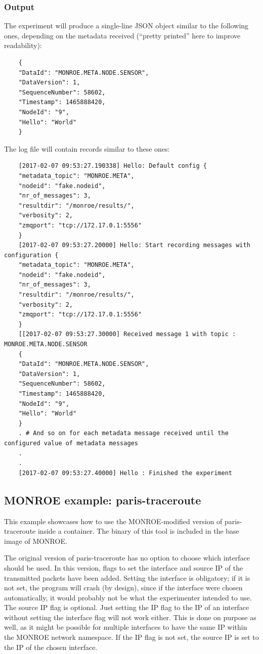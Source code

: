 \documentclass[a4paper,10pt]{article}
\newcommand{\VerbatimFont}{\footnotesize}
\newcommand{\monroe}{MONROE}
\begin{document}
\subsubsection{Output}

The experiment will produce a single-line JSON object similar to the following ones, depending on the metadata received (``pretty printed'' here to improve readability):

{\VerbatimFont
	\begin{verbatim}
	{
	"DataId": "MONROE.META.NODE.SENSOR",
	"DataVersion": 1,
	"SequenceNumber": 58602,
	"Timestamp": 1465888420,
	"NodeId": "9",
	"Hello": "World"
	}
	\end{verbatim}}

\noindent The log file will contain records similar to these ones:

{\VerbatimFont
	\begin{verbatim}
	[2017-02-07 09:53:27.190338] Hello: Default config {
	"metadata_topic": "MONROE.META", 
	"nodeid": "fake.nodeid", 
	"nr_of_messages": 3, 
	"resultdir": "/monroe/results/", 
	"verbosity": 2, 
	"zmqport": "tcp://172.17.0.1:5556"
	}
	[2017-02-07 09:53:27.20000] Hello: Start recording messages with configuration {
	"metadata_topic": "MONROE.META", 
	"nodeid": "fake.nodeid", 
	"nr_of_messages": 3, 
	"resultdir": "/monroe/results/", 
	"verbosity": 2, 
	"zmqport": "tcp://172.17.0.1:5556"
	}
	[[2017-02-07 09:53:27.30000] Received message 1 with topic : MONROE.META.NODE.SENSOR
	{
	"DataId": "MONROE.META.NODE.SENSOR",
	"DataVersion": 1,
	"SequenceNumber": 58602,
	"Timestamp": 1465888420,
	"NodeId": "9",
	"Hello": "World"
	}
	. # And so on for each metadata message received until the configured value of metadata messages
	.
	.
	[2017-02-07 09:53:27.40000] Hello : Finished the experiment
	\end{verbatim}}


\subsection{\monroe{} example: paris-traceroute}

This example showcases how to use the \monroe{}-modified version of paris-traceroute inside a container.
The binary of this tool is included in the base image of \monroe{}.

The original version of paris-traceroute has no option to choose which interface should be used.
In this version, flags to set the interface and source IP of the transmitted packets have been added.
Setting the interface is obligatory; if it is not set, the program will crash (by design), since if the interface were chosen automatically, it would probably not be what the experimenter intended to use.
The source IP flag is optional.
Just setting the IP flag to the IP of an interface without setting the interface flag will not work either.
This is done on purpose as well, as it might be possible for multiple interfaces to have the same IP within the \monroe{} network namespace.
If the IP flag is not set, the source IP is set to the IP of the chosen interface.
\end{document}
